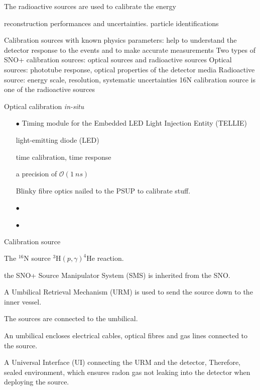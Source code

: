 The radioactive sources are used to calibrate the energy 

reconstruction performances and uncertainties.
particle identifications



Calibration sources with known physics parameters: help to
understand the detector response to the events and to make
accurate measurements
Two types of SNO+ calibration sources: optical sources and
radioactive sources
Optical sources: phototube response, optical properties of the
detector media
Radioactive source: energy scale, resolution, systematic
uncertainties
16N calibration source is one of the radioactive sources


\cite{esteban2019global}




Optical calibration  {\emph {in-situ}} 
\begin{itemize}  
	\item[$\bullet$] Timing module for the Embedded LED Light Injection Entity (TELLIE)
	
	light-emitting diode (LED)
	
	
	time calibration, time response 
	
	a precision of $\mathcal{O} (1~ns)$
	
	Blinky fibre optics nailed to the PSUP to calibrate stuff.
	
	
	
	\item[$\bullet$]  
	
	
	\item[$\bullet$] 
\end{itemize}





Calibration source

The $^{16}$N source
$^{3}$H$(p,\gamma)^{4}$He reaction.

the SNO+ Source Manipulator System (SMS)
is inherited from the SNO.



A Umbilical Retrieval Mechanism (URM) is used to send the source down to the inner vessel.



The sources are connected to the umbilical.


An umbilical encloses electrical cables, optical fibres and gas lines connected to the source.

A Universal Interface (UI) connecting the URM and the detector, 
Therefore, sealed environment, which 
ensures radon gas not leaking into the detector when deploying the source.

